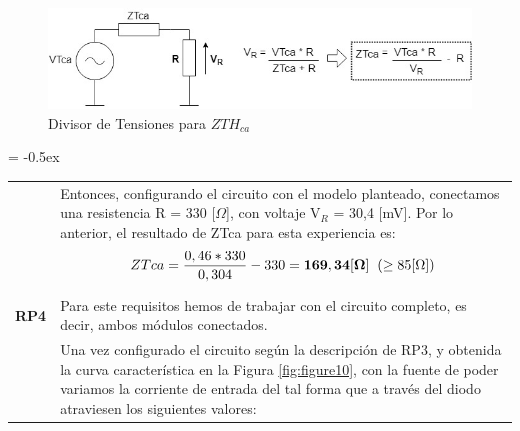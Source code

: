 \begin{figure}[h!]
    \Centering
    \includegraphics[scale=0.6]{Imagenes/6Analisis/divT.jpg}
    \caption{Divisor de Tensiones para $ZTH_{ca}$}
	\label{fig:figure14}
\end{figure}
\newpage
\centering
\extrarowheight = -0.5ex
\renewcommand{\arraystretch}{2.25}
\begin{tabular}{p{} p{}}

& Entonces, configurando el circuito con el modelo planteado, conectamos una resistencia R = 330 [$\Omega$], con voltaje V$_{R}$ = 30,4 [mV]. Por lo anterior, el resultado de ZTca para esta experiencia es: 
\[ ZTca = \frac{0,46 * 330}{0,304} - 330 = \mathbf{169,34 [\Omega]} \hspace{0.2cm} (\geq 85[\Omega] )
\]
\\ 

\textbf{RP4} & Para este requisitos hemos de trabajar con el circuito completo, es decir, ambos módulos conectados. \\
& Una vez configurado el circuito según la descripción de RP3, y obtenida la curva característica en la Figura \ref{fig:figure10}, con la fuente de poder variamos la corriente de entrada del tal forma que a través del diodo atraviesen los siguientes valores: \\
\end{tabular}

